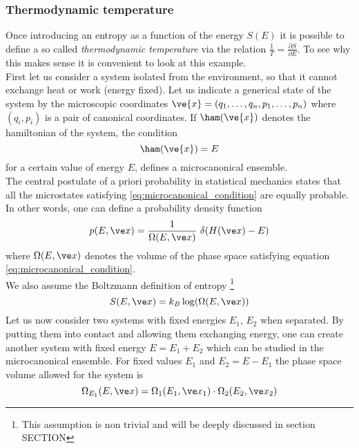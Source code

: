 \subsubsection*{Thermodynamic temperature}
Once introducing an entropy as a function of the energy $S(E)$ it is possible to define a so called \emph{thermodynamic temperature} via the relation $\frac{1}{T} = \frac{\partial S}{\partial E}$.
To see why this makes sense it is convenient to look at this example. \\
First let us consider a system isolated from the environment, so that it cannot exchange heat or work (energy fixed). Let us indicate a generical
state of the system by the microscopic coordinates $\ve{x} = (q_1, \dots, q_n, p_1, \dots, p_n)$ where $(q_i, p_i)$ is a pair of canonical coordinates. If $\ham(\ve{x})$ denotes the hamiltonian of the system,
the condition
\begin{equation}
    \ham(\ve{x}) = E
    \label{eq:microcanonical_condition}
\end{equation}    
for a certain value of energy $E$, defines a microcanonical ensemble. \\
The central postulate of a priori probability in statistical mechanics states that all the microstates satisfying \ref{eq:microcanonical_condition} are equally probable. In other words, one can
define a probability density function
\begin{equation*}
    p(E, \ve x) = \frac{1}{\Omega(E, \ve x)} \ \delta(H(\ve x) - E)
\end{equation*}
where $\Omega(E, \ve x)$ denotes the volume of the phase space satisfying equation \ref{eq:microcanonical_condition}. \\
We also assume the Boltzmann definition of entropy \footnote{This assumption is non trivial and will be deeply discussed in section SECTION}
\begin{equation}
    S(E, \ve x) = k_B \log(\Omega(E, \ve x))
    \label{eq:Boltzmann_entropy}
\end{equation}
Let us now consider two systems with fixed energies $E_1$, $E_2$ when separated. By putting them into contact and allowing them exchanging energy, one can create another system 
with fixed energy $E = E_1 + E_2$ which can be studied in the microcanonical ensemble.
For fixed values $E_1$ and $E_2 = E - E_1$ the phase space volume allowed for the system is 
\begin{equation*} 
    \Omega_{E_1}(E, \ve x) = \Omega_1(E_1, \ve x_1) \cdot \Omega_2(E_2, \ve x_2)
\end{equation*}
